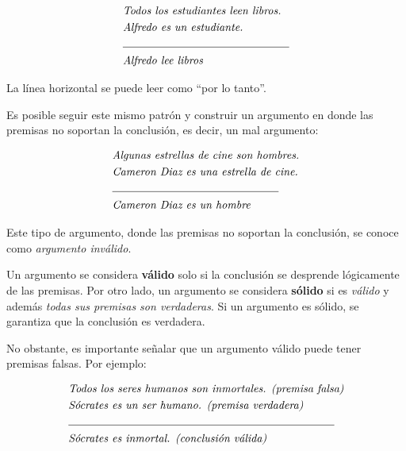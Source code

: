 \begin{equation*}
    \begin{split}
        & \textit{Todos los estudiantes leen libros.} \\
        & \textit{Alfredo es un estudiante.} \\
        & \text{\noindent\rule{15em}{0.4pt}} \\
        & \textit{Alfredo lee libros}
    \end{split}
\end{equation*}

La línea horizontal se puede leer como ``por lo tanto''. 

Es posible seguir este mismo patrón y construir un argumento en donde las premisas no soportan la conclusión, es decir, un mal argumento:

\begin{equation*}
    \begin{split}
        & \textit{Algunas estrellas de cine son hombres.} \\
        & \textit{Cameron Diaz es una estrella de cine.} \\
        & \text{\noindent\rule{15em}{0.4pt}} \\
        & \textit{Cameron Diaz es un hombre}
    \end{split}
\end{equation*}

Este tipo de argumento, donde las premisas no soportan la conclusión, se conoce como \textit{argumento inválido}. 

Un argumento se considera \textbf{válido} solo si la conclusión se desprende lógicamente de las premisas. Por otro lado, un argumento se considera \textbf{sólido} si es \textit{válido} y además \textit{todas sus premisas son verdaderas}. Si un argumento es sólido, se garantiza que la conclusión es verdadera.

No obstante, es importante señalar que un argumento válido puede tener premisas falsas. Por ejemplo: 

\begin{equation*}
    \begin{split}
        & \textit{Todos los seres humanos son inmortales. (premisa falsa)} \\
        & \textit{Sócrates es un ser humano. (premisa verdadera)} \\
        & \text{\noindent\rule{24em}{0.4pt}} \\
        & \textit{Sócrates es inmortal. (conclusión válida)}
    \end{split}
\end{equation*}

